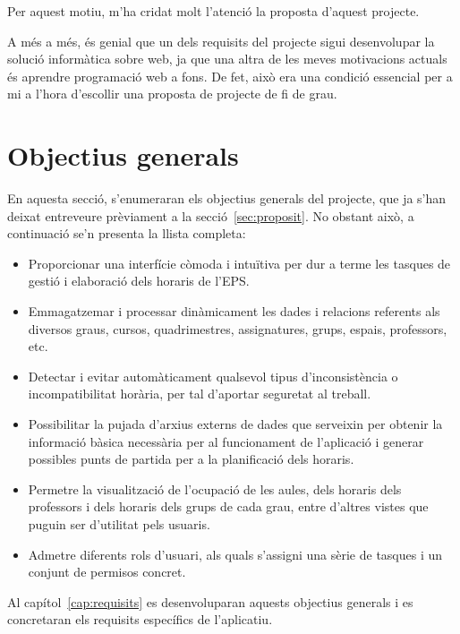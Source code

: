 \documentclass[a4paper,12pt]{ThesisStyle}
\begin{document}
Per aquest motiu, m'ha cridat molt l'atenció la proposta d'aquest projecte. 

A més a més, és genial que un dels requisits del projecte sigui desenvolupar la solució informàtica sobre web, ja que una altra de les meves motivacions actuals és aprendre programació web a fons. De fet, això era una condició essencial per a mi a l'hora d'escollir una proposta de projecte de fi de grau.

\section{Objectius generals}
\label{sec:objectius_generals}

En aquesta secció, s'enumeraran els objectius generals del projecte, que ja s'han deixat entreveure prèviament a la secció~\ref{sec:proposit}. No obstant això, a continuació se'n presenta la llista completa:
\begin{itemize}
  \item Proporcionar una interfície còmoda i intuïtiva per dur a terme les tasques de gestió i elaboració dels horaris de l'EPS.
  \item Emmagatzemar i processar dinàmicament les dades i relacions referents als diversos graus, cursos, quadrimestres, assignatures, grups, espais, professors, etc.
  \item Detectar i evitar automàticament qualsevol tipus d'inconsistència o incompatibilitat horària, per tal d'aportar seguretat al treball.
  \item Possibilitar la pujada d'arxius externs de dades que serveixin per obtenir la informació bàsica necessària per al funcionament de l'aplicació i generar possibles punts de partida per a la planificació dels horaris.
  \item Permetre la visualització de l'ocupació de les aules, dels horaris dels professors i dels horaris dels grups de cada grau, entre d'altres vistes que puguin ser d'utilitat pels usuaris.
  \item Admetre diferents rols d'usuari, als quals s'assigni una sèrie de tasques i un conjunt de permisos concret.
\end{itemize}

Al capítol~\ref{cap:requisits} es desenvoluparan aquests objectius generals i es concretaran els requisits específics de l'aplicatiu.


\end{document}
